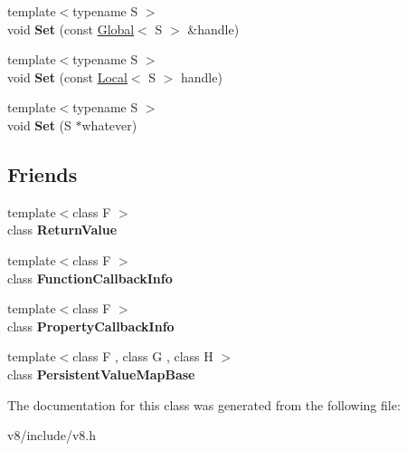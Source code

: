 \begin{DoxyCompactItemize}
\item 
\hypertarget{classv8_1_1ReturnValue_a57c4b962cf2ca387d3fb9a2f8e47a963}{}{\footnotesize template$<$typename S $>$ }\\void {\bfseries Set} (const \hyperlink{classv8_1_1Global}{Global}$<$ S $>$ \&handle)\label{classv8_1_1ReturnValue_a57c4b962cf2ca387d3fb9a2f8e47a963}

\item 
\hypertarget{classv8_1_1ReturnValue_a69d99ab0e0c12d68291d425287532799}{}{\footnotesize template$<$typename S $>$ }\\void {\bfseries Set} (const \hyperlink{classv8_1_1Local}{Local}$<$ S $>$ handle)\label{classv8_1_1ReturnValue_a69d99ab0e0c12d68291d425287532799}

\item 
\hypertarget{classv8_1_1ReturnValue_a766f60aa4d7d86bfb949d3c40b147ef7}{}{\footnotesize template$<$typename S $>$ }\\void {\bfseries Set} (S $\ast$whatever)\label{classv8_1_1ReturnValue_a766f60aa4d7d86bfb949d3c40b147ef7}

\end{DoxyCompactItemize}
\subsection*{Friends}
\begin{DoxyCompactItemize}
\item 
\hypertarget{classv8_1_1ReturnValue_a53f604d3d6f2dc0647df33c9979f116a}{}{\footnotesize template$<$class F $>$ }\\class {\bfseries Return\+Value}\label{classv8_1_1ReturnValue_a53f604d3d6f2dc0647df33c9979f116a}

\item 
\hypertarget{classv8_1_1ReturnValue_a76786e6fa2d0eac5e2d4f647659d0d23}{}{\footnotesize template$<$class F $>$ }\\class {\bfseries Function\+Callback\+Info}\label{classv8_1_1ReturnValue_a76786e6fa2d0eac5e2d4f647659d0d23}

\item 
\hypertarget{classv8_1_1ReturnValue_a5018adab21fade2b42f4f60e45fa1083}{}{\footnotesize template$<$class F $>$ }\\class {\bfseries Property\+Callback\+Info}\label{classv8_1_1ReturnValue_a5018adab21fade2b42f4f60e45fa1083}

\item 
\hypertarget{classv8_1_1ReturnValue_a08e2b8f164392d71811ce6cc134f33e3}{}{\footnotesize template$<$class F , class G , class H $>$ }\\class {\bfseries Persistent\+Value\+Map\+Base}\label{classv8_1_1ReturnValue_a08e2b8f164392d71811ce6cc134f33e3}

\end{DoxyCompactItemize}


The documentation for this class was generated from the following file\+:\begin{DoxyCompactItemize}
\item 
v8/include/v8.\+h\end{DoxyCompactItemize}
